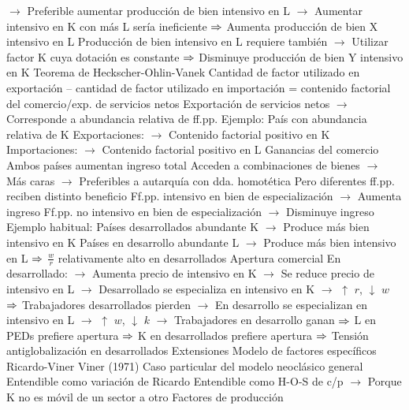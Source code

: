 \documentclass{nuevotema}
\begin{document}
\begin{esquemal}
				\4[] $\to$ Preferible aumentar producción de bien intensivo en L
				\4[] $\to$ Aumentar intensivo en K con más L sería ineficiente
				\4[] $\Rightarrow$ Aumenta producción de bien X intensivo en L
				\4[] Producción de bien intensivo en L requiere también
				\4[] $\to$ Utilizar factor K cuya dotación es constante
				\4[] $\Rightarrow$ Disminuye producción de bien Y intensivo en K
			\3 Teorema de Heckscher-Ohlin-Vanek
				\4 
				\4[] Cantidad de factor utilizado en exportación
				\4[] -- cantidad de factor utilizado en importación
				\4[] = contenido factorial del comercio/exp. de servicios netos
				\4[] Exportación de servicios netos
				\4[] $\to$ Corresponde a abundancia relativa de ff.pp.
				\4 Ejemplo:
				\4[] País con abundancia relativa de K
				\4[] Exportaciones:
				\4[] $\to$ Contenido factorial positivo en K
				\4[] Importaciones:
				\4[] $\to$ Contenido factorial positivo en L
			\3 Ganancias del comercio
				\4 Ambos países aumentan ingreso total
				\4[] Acceden a combinaciones de bienes
				\4[] $\to$ Más caras
				\4[] $\to$ Preferibles a autarquía con dda. homotética
				\4 Pero diferentes ff.pp. reciben distinto beneficio
				\4[] Ff.pp. intensivo en bien de especialización
				\4[] $\to$ Aumenta ingreso
				\4[] Ff.pp. no intensivo en bien de especialización
				\4[] $\to$ Disminuye ingreso
				\4 Ejemplo habitual:
				\4[] Países desarrollados abundante K
				\4[] $\to$ Produce más bien intensivo en K
				\4[] Países en desarrollo abundante L
				\4[] $\to$ Produce más bien intensivo en L
				\4[] $\Rightarrow$ $\frac{w}{r}$ relativamente alto en desarrollados
				\4[] Apertura comercial
				\4[] En desarrollado:
				\4[] $\to$ Aumenta precio de intensivo en K
				\4[] $\to$ Se reduce precio de intensivo en L
				\4[] $\to$ Desarrollado se especializa en intensivo en K
				\4[] $\to$ $\uparrow$ $r$, $\downarrow$ $w$
				\4[] $\Rightarrow$ Trabajadores desarrollados pierden
				\4[] $\to$ En desarrollo se especializan en intensivo en L
				\4[] $\to$ $\uparrow$ $w$, $\downarrow$ $k$
				\4[] $\to$ Trabajadores en desarrollo ganan
				\4[] $\Rightarrow$ L en PEDs prefiere apertura
				\4[] $\Rightarrow$ K en desarrollados prefiere apertura
				\4[] $\Rightarrow$ Tensión antiglobalización en desarrollados
		\2 Extensiones
			\3 Modelo de factores específicos Ricardo-Viner
				\4 Viner (1971)
				\4 Caso particular del modelo neoclásico general
				\4[] Entendible como variación de Ricardo
				\4[] Entendible como H-O-S de c/p
				\4[] $\to$ Porque K no es móvil de un sector a otro
				\4 Factores de producción

\end{esquemal}
\end{document}
